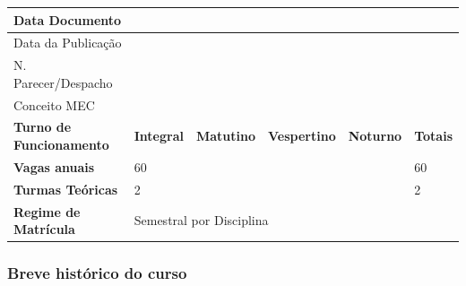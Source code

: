 \begin{table}[h]
\begin{tabular}{|l|l|l|l|l|l|}
Data Documento                  & \multicolumn{2}{l|}{}               & \multicolumn{3}{l|}{}                                                                          \\ \hline
Data da Publicação              & \multicolumn{2}{l|}{}               & \multicolumn{3}{l|}{}                                                                          \\ \hline
N. Parecer/Despacho             & \multicolumn{2}{l|}{}               & \multicolumn{3}{l|}{}                                                                          \\ \hline
Conceito MEC                    & \multicolumn{2}{l|}{}               & \multicolumn{3}{l|}{}                                                                          \\ \hline
\textbf{Turno de Funcionamento} & \textbf{Integral}                   & \textbf{Matutino}                   & \textbf{Vespertino} & \textbf{Noturno} & \textbf{Totais} \\ \hline
\textbf{Vagas anuais}           &      60                               &                                     &                   &                  & 60              \\ \hline
\textbf{Turmas Teóricas}        &       2                              &                                     &                    &                  & 2               \\ \hline
\textbf{Regime de Matrícula}    & \multicolumn{5}{l|}{Semestral por Disciplina}                                                                                        \\ \hline
\end{tabular}
\end{table}


\subsubsection{Breve histórico do curso}


